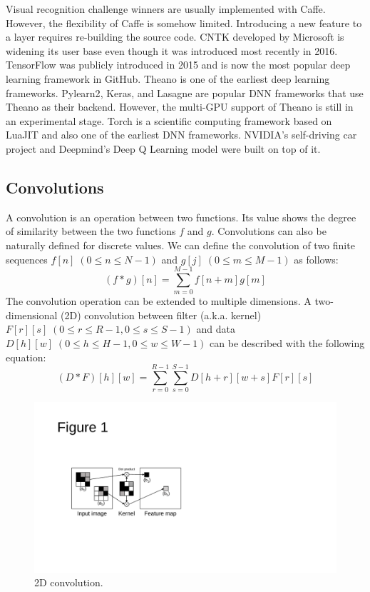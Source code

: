 Visual recognition challenge winners are usually implemented with Caffe\cite{ILSVRC15, RCNN, vgg}. However, the flexibility of Caffe is somehow limited. Introducing a new feature to a layer requires re-building the source code. CNTK developed by Microsoft is widening its user base even though it was introduced most recently in 2016. TensorFlow was publicly introduced in 2015 and is now the most popular deep learning framework in GitHub\cite{github}. Theano is one of the earliest deep learning frameworks. Pylearn2\cite{pylearn2}, Keras\cite{keras}, and Lasagne\cite{lasagne} are popular DNN frameworks that use Theano as their backend. However, the multi-GPU support of Theano is still in an experimental stage. Torch is a scientific computing framework based on LuaJIT\cite{torch} and also one of the earliest DNN frameworks. NVIDIA's self-driving car project\cite{nvdave} and Deepmind's Deep Q Learning model\cite{mnih2015humanlevel} were built on top of it.

\subsection{Convolutions}
A convolution is an operation between two functions. Its value shows the degree of similarity between the two functions $f$ and $g$. Convolutions can also be naturally defined for discrete values. We can define the convolution of two finite sequences $f[n] \; (0 \leq n \leq N-1)$ and $g[j] \; (0 \leq m \leq M-1)$ as follows:
\begin{equation}
\label{def_discrete}
\left ( f * g \right )[n] = \sum_{m=0}^{M-1} f[n + m]g[m]
\end{equation}
The convolution operation can be extended to multiple dimensions. A two-dimensional (2D) convolution between filter (a.k.a. kernel) $F[r][s] \; (0 \leq r \leq R-1, 0 \leq s \leq S-1)$ and data $D[h][w] \; (0 \leq h \leq H-1, 0 \leq w \leq W-1)$ can be described with the following equation:
\begin{equation}
\left ( D * F \right )[h][w] = \sum_{r=0}^{R-1}\sum_{s=0}^{S-1} D[h + r][w + s] F[r][s]
\label{2d-conv}
\end{equation}

\begin{figure}[htbp]
  \centering
  \includegraphics[width=0.6\linewidth]{./figures/feature-map}
  \caption{2D convolution. }
  \label{fig_conv}
\end{figure}

